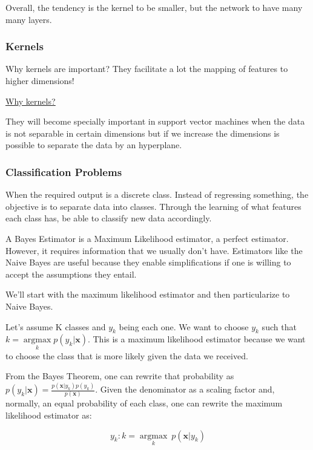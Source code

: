 

Overall, the tendency is the kernel to be smaller, but the network to have many many layers.


\subsubsection{Kernels}
Why kernels are important? They facilitate a lot the mapping of features to higher dimensions!

\href{https://medium.com/@zxr.nju/what-is-the-kernel-trick-why-is-it-important-98a98db0961d}{\ul{Why kernels?}}

They will become specially important in support vector machines when the data is not separable in certain dimensions but if we increase the dimensions is possible to separate the data by an hyperplane.



\subsubsection{Classification Problems}

When the required output is a discrete class. Instead of regressing something, the objective is to separate data into classes. Through the learning of what features each class has, be able to classify new data accordingly.


A Bayes Estimator is a Maximum Likelihood estimator, a perfect estimator. However, it requires information that we usually don't have. Estimators like the Naive Bayes are useful because they enable simplifications if one is willing to accept the assumptions they entail.

We'll start with the maximum likelihood estimator and then particularize to Naive Bayes. 

Let's assume K classes and $y_k$ being each one. We want to choose $y_k$ such that $k = \underset{k}{\operatorname{argmax}} p(y_k|\mathbf{x})$.
This is a maximum likelihood estimator because we want to choose the class that is more likely given the data we received.

From the Bayes Theorem, one can rewrite that probability as $p(y_k|\mathbf{x}) = \frac{p(\mathbf{x}|y_k) p(y_k)}{p(\mathbf{x})}$. Given the denominator as a scaling factor and, normally, an equal probability of each class, one can rewrite the maximum likelihood estimator as:

\begin{equation}
    y_k : k = \underset{k}{\operatorname{argmax}} \ p(\mathbf{x}|y_k)
\end{equation}

